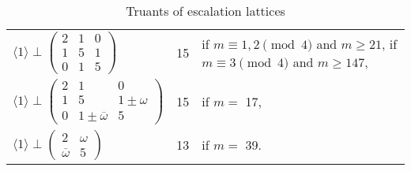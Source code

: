 \documentclass[a4paper,10pt,reqno]{amsart}
\begin{document}
\begin{scriptsize}
\begin{table}[p]
\begin{tabular}{lcl}
${\langle {1} \rangle} \perp {\begin{pmatrix}
  2 & 1 & 0 \\
  1 & 5 & 1 \\
  0 & 1 & 5
\end{pmatrix}}$
                  & 15     & \parbox{20em}{
                             if $m \equiv 1,2 \pmod{4}$ and $m \geq 21$,\\
                             if $m \equiv 3 \pmod{4}$ and $m \geq 147$, \\
                             } \\%
${\langle {1} \rangle} \perp {\begin{pmatrix}
  2 & 1 & 0 \\
  1 & 5 & {1\pm\omega} \\
  0 & {1\pm{{{\overline{\omega}}}}} & 5
\end{pmatrix}}$
                  & 15     & if $m =$     17, \\

${\langle {1} \rangle} \perp {\begin{pmatrix}
  2 & {\omega} \\
  {{{\overline{\omega}}}} & 5
\end{pmatrix}}$
                  & 13     & if $m =$ 39.\\ \hline
\end{tabular} \vspace{2ex}
\caption{Truants of escalation lattices}
\label{tbl:Proof of universality of escalator}
\end{table}
\end{scriptsize}
\end{document}
